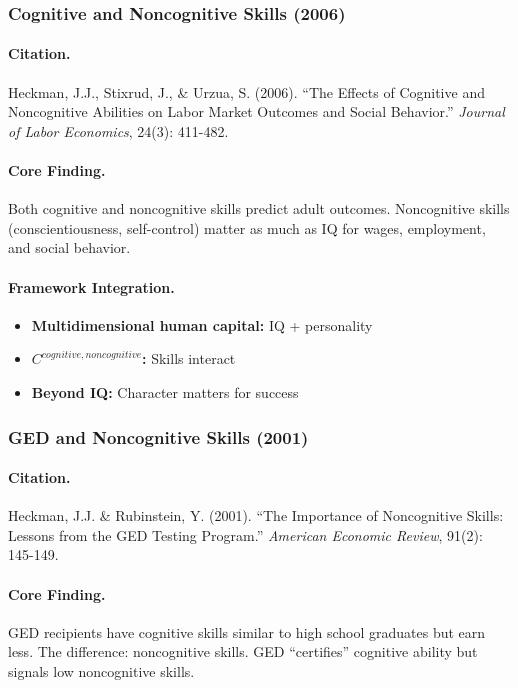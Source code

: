 \subsubsection{Cognitive and Noncognitive Skills (2006)}

\paragraph{Citation.}
Heckman, J.J., Stixrud, J., \& Urzua, S. (2006). ``The Effects of Cognitive
and Noncognitive Abilities on Labor Market Outcomes and Social Behavior.''
\emph{Journal of Labor Economics}, 24(3): 411-482.

\paragraph{Core Finding.}
Both cognitive and noncognitive skills predict adult outcomes.
Noncognitive skills (conscientiousness, self-control) matter as much
as IQ for wages, employment, and social behavior.

\paragraph{Framework Integration.}
\begin{itemize}
  \item \textbf{Multidimensional human capital:} IQ + personality
  \item \textbf{$C^{cognitive,noncognitive}$:} Skills interact
  \item \textbf{Beyond IQ:} Character matters for success
\end{itemize}

\subsubsection{GED and Noncognitive Skills (2001)}

\paragraph{Citation.}
Heckman, J.J. \& Rubinstein, Y. (2001). ``The Importance of Noncognitive
Skills: Lessons from the GED Testing Program.''
\emph{American Economic Review}, 91(2): 145-149.

\paragraph{Core Finding.}
GED recipients have cognitive skills similar to high school graduates
but earn less. The difference: noncognitive skills. GED ``certifies''
cognitive ability but signals low noncognitive skills.


